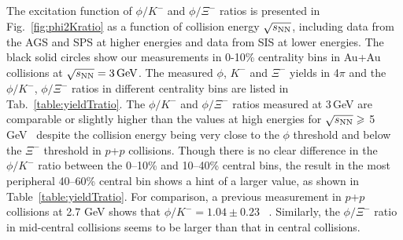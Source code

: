 \documentclass[%
 reprint,	
showpacs,
 amsmath,amssymb,
 aps,
 prc,
]{revtex4-1}
\begin{document}
The excitation function of $\phi/K^-$ and $\phi/\Xi^-$ ratios is presented in Fig.~\ref{fig:phi2Kratio} as a function of collision energy $\sqrt{s_{\rm NN}}$, including data from the AGS and SPS at higher energies and data from SIS at lower energies. The black solid circles show our measurements in 0-10\% centrality bins in Au+Au collisions at ${\sqrt{s_{\rm NN}} = \rm{3\,GeV}}$. The measured $\phi$, $K^-$ and $\Xi^-$ yields in 4$\pi$ and the $\phi/K^-$, $\phi/\Xi^-$ ratios in different centrality bins are listed in Tab.~\ref{table:yieldTratio}. The $\phi/K^-$ and $\phi/\Xi^-$ ratios measured at 3\,GeV are %
comparable or slightly higher than the values at high energies for $\sqrt{s_{\rm NN}}\geqslant$ 5\,GeV~\cite{NA49_phi,NA49_piK,NA49_piK2,E917_phi,ALICE_phi_2p7TeV,STAR_phi_64a200GeV,Xi_ArKCl_HADES,star_bes_strangeness} despite the collision energy being very close to the $\phi$ threshold and below the $\Xi^-$ threshold in $p$+$p$ collisions. %
Though there is no clear difference in the $\phi/K^-$ ratio between the 0--10\% and 10--40\% central bins, the result in the most peripheral 40--60\% central bin shows a hint of a larger value, as shown in Table~\ref{table:yieldTratio}. For comparison, a previous measurement in $p$+$p$ collisions at 2.7 GeV shows that $\phi/K^- = 1.04\pm0.23$ ~\cite{ANKE_phi}. Similarly, the $\phi/\Xi^-$ ratio in mid-central collisions seems to be larger than that in central collisions.
\end{document}
